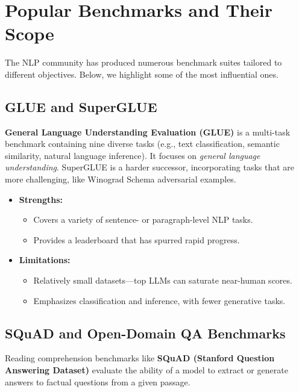 \section{Popular Benchmarks and Their Scope}
\noindent
The NLP community has produced numerous benchmark suites tailored to different objectives. Below, we highlight some of the most influential ones.

\subsection{GLUE and SuperGLUE}
\noindent
\textbf{General Language Understanding Evaluation (GLUE)} \cite{wang2018glue} is a multi-task benchmark containing nine diverse tasks (e.g., text classification, semantic similarity, natural language inference). It focuses on \emph{general language understanding}. SuperGLUE \cite{wang2019superglue} is a harder successor, incorporating tasks that are more challenging, like Winograd Schema adversarial examples.

\begin{itemize}
    \item \textbf{Strengths:} 
        \begin{itemize}
            \item Covers a variety of sentence- or paragraph-level NLP tasks. 
            \item Provides a leaderboard that has spurred rapid progress.
        \end{itemize}
    \item \textbf{Limitations:}
        \begin{itemize}
            \item Relatively small datasets—top LLMs can saturate near-human scores.
            \item Emphasizes classification and inference, with fewer generative tasks.
        \end{itemize}
\end{itemize}

\subsection{SQuAD and Open-Domain QA Benchmarks}
\noindent
Reading comprehension benchmarks like \textbf{SQuAD (Stanford Question Answering Dataset)} \cite{rajpurkar2016squad} evaluate the ability of a model to extract or generate answers to factual questions from a given passage.

